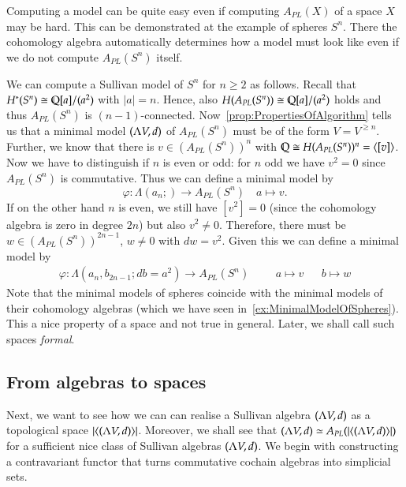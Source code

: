  Computing a model can be quite easy even if
 computing $A_{PL}(X)$ of a space $X$ may be  hard. This can be 
 demonstrated at the example of spheres $S^n$. There the cohomology algebra automatically determines how a model must look like
 even if we do not compute $A_{PL}(S^n)$ itself.
 \begin{Example}
\label{ex:MinimalModelOfSpheresAPL}
  We can compute a Sullivan model of $S^n$ for $n \geq 2$
  as follows. Recall that $H^*(S^n) \cong \mathbb{Q}[a]/(a^2)$ with $|a| = n$. Hence, also
  $H(A_{PL}(S^n)) \cong \mathbb{Q}[a]/(a^2)$ holds and thus $A_{PL}(S^n)$ is $(n-1)$-connected.
  Now~\ref{prop:PropertiesOfAlgorithm} tells us that a minimal model $(\Lambda V,d)$ of $A_{PL}(S^n)$ must be 
  of the form $V = V^{\geq n}$. Further, we know that there is $v \in (A_{PL}(S^n))^n$ with 
  $\mathbb{Q} \cong H(A_{PL}(S^n))^n = \langle [v] \rangle$. Now we have to distinguish if $n$ is even or odd:
  for $n$ odd  we have $v^2 = 0$ since $A_{PL}(S^n)$ is commutative. Thus we can define
  a minimal model by 
  $$\varphi \colon \Lambda(a_n;) \to A_{PL}(S^n) \quad  a \mapsto v.$$
  If on the other hand $n$ is even, we still have $[v^2] = 0$ (since the cohomology algebra is zero in degree $2n$)
  but also $v^2 \neq 0$. Therefore, there must be $w \in (A_{PL}(S^n))^{2n-1}$, $w \neq 0$ with $dw = v^2$. Given this we can define
  a minimal model by
  \begin{align*}
  \varphi \colon \Lambda(a_n, b_{2n-1} ; db = a^2) \to A_{PL}(S^n)& &  &a \mapsto v 
   & &b \mapsto w
  \end{align*}
  Note that the minimal models of spheres coincide with the minimal models of their cohomology algebras 
  (which we have seen in~\ref{ex:MinimalModelOfSpheres}). This a  nice property of a space 
  and not true in general. Later, we shall call such spaces \emph{formal}.
 \end{Example}

 
 
 \subsection{From algebras to spaces}
 
 Next, we want to see how we can can realise a Sullivan algebra $(\Lambda V,d)$ as a topological space 
 $| \langle (\Lambda V,d) \rangle |$. Moreover, we shall see that $(\Lambda V,d) \simeq A_{PL}(| \langle (\Lambda V,d) \rangle |)$ for a
 sufficient nice class of Sullivan algebras $(\Lambda V,d)$. 
 We begin with constructing a contravariant functor that turns commutative cochain algebras into simplicial sets.
 
